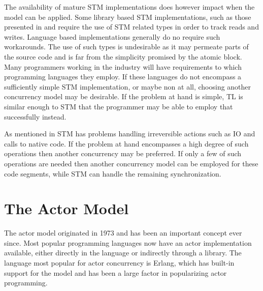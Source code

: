 The availability of mature \ac{STM} implementations does however impact when the model can be applied. Some library based \ac{STM} implementations, such as those presented in \cite{ramadan2009committing} and \cite{herlihy2006flexible} require the use of \ac{STM} related types in order to track reads and writes. Language based implementations generally do no require such workarounds. The use of such types is undesirable as it may permeate parts of the source code and is far from the simplicity promised by the atomic block. Many programmers working in the industry will have requirements to which programming languages they employ. If these languages do not encompass a sufficiently simple \ac{STM} implementation, or maybe non at all, choosing another concurrency model may be desirable. If the problem at hand is simple, \ac{TL} is similar enough to \ac{STM} that the programmer may be able to employ that successfully instead.

As mentioned in  STM has problems handling irreversible actions such as \ac{IO} and calls to native code. If the problem at hand encompasses a high degree of such operations then another concurrency may be preferred. If only a few of such operations are needed then another concurrency model can be employed for these code segments, while \ac{STM} can handle the remaining synchronization.


\section{The Actor Model}\label{sec:choose_Actor}
The actor model originated in 1973 and has been an important concept ever since\cite[p. 14]{haller2012actors}. Most popular programming languages now have an actor implementation available\cite[p. 152]{sevenModels}, either directly in the language or indirectly through a library. The language most popular for actor concurrency is Erlang, which has built-in support for the model and has been a large factor in popularizing actor programming\cite[p. 152]{sevenModels}.

